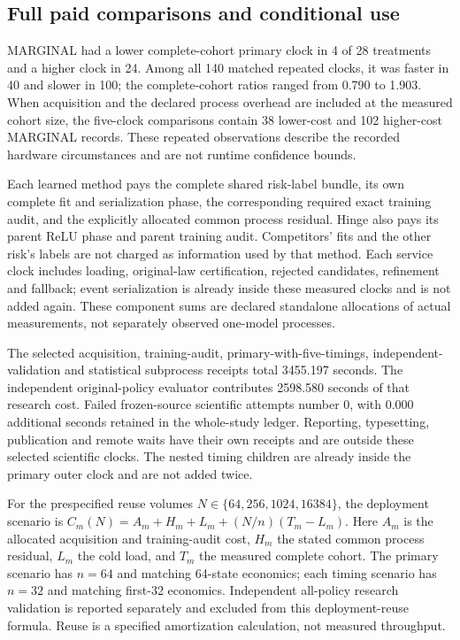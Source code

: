 \subsection{Full paid comparisons and conditional use}\label{subsec:costresults121}

MARGINAL had a lower complete-cohort primary clock in 4 of 28 treatments and a higher clock in 24. Among all 140 matched repeated clocks, it was faster in 40 and slower in 100; the complete-cohort ratios ranged from 0.790 to 1.903. When acquisition and the declared process overhead are included at the measured cohort size, the five-clock comparisons contain 38 lower-cost and 102 higher-cost MARGINAL records. These repeated observations describe the recorded hardware circumstances and are not runtime confidence bounds.

Each learned method pays the complete shared risk-label bundle, its own complete fit and serialization phase, the corresponding required exact training audit, and the explicitly allocated common process residual. Hinge also pays its parent ReLU phase and parent training audit. Competitors' fits and the other risk's labels are not charged as information used by that method. Each service clock includes loading, original-law certification, rejected candidates, refinement and fallback; event serialization is already inside these measured clocks and is not added again. These component sums are declared standalone allocations of actual measurements, not separately observed one-model processes.

The selected acquisition, training-audit, primary-with-five-timings, independent-validation and statistical subprocess receipts total 3455.197 seconds. The independent original-policy evaluator contributes 2598.580 seconds of that research cost. Failed frozen-source scientific attempts number 0, with 0.000 additional seconds retained in the whole-study ledger. Reporting, typesetting, publication and remote waits have their own receipts and are outside these selected scientific clocks. The nested timing children are already inside the primary outer clock and are not added twice.

For the prespecified reuse volumes $N\in\{64,256,1024,16384\}$, the deployment scenario is $C_m(N)=A_m+H_m+L_m+(N/n)(T_m-L_m)$. Here $A_m$ is the allocated acquisition and training-audit cost, $H_m$ the stated common process residual, $L_m$ the cold load, and $T_m$ the measured complete cohort. The primary scenario has $n=64$ and matching 64-state economics; each timing scenario has $n=32$ and matching first-32 economics. Independent all-policy research validation is reported separately and excluded from this deployment-reuse formula. Reuse is a specified amortization calculation, not measured throughput.

